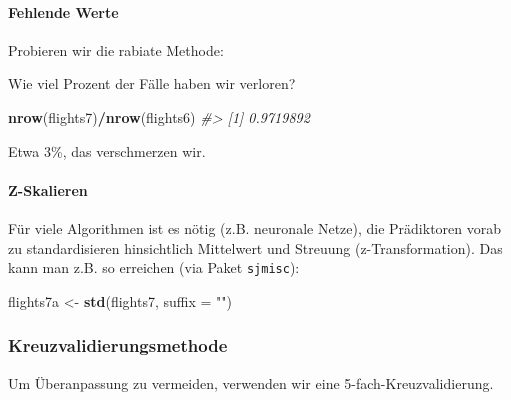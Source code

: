 \documentclass[]{article}
\newenvironment{Shaded}{\begin{snugshade}}{\end{snugshade}}
\newcommand{\CommentTok}[1]{\textcolor[rgb]{0.56,0.35,0.01}{\textit{#1}}}
\newcommand{\DataTypeTok}[1]{\textcolor[rgb]{0.13,0.29,0.53}{#1}}
\newcommand{\KeywordTok}[1]{\textcolor[rgb]{0.13,0.29,0.53}{\textbf{#1}}}
\newcommand{\NormalTok}[1]{#1}
\newcommand{\OperatorTok}[1]{\textcolor[rgb]{0.81,0.36,0.00}{\textbf{#1}}}
\newcommand{\StringTok}[1]{\textcolor[rgb]{0.31,0.60,0.02}{#1}}
\let\oldparagraph\paragraph
\renewcommand{\paragraph}[1]{\oldparagraph{#1}\mbox{}}
\begin{document}
\hypertarget{fehlende-werte}{%
\paragraph{Fehlende Werte}\label{fehlende-werte}}

Probieren wir die rabiate Methode:

\begin{Shaded}
\end{Shaded}

Wie viel Prozent der Fälle haben wir verloren?

\begin{Shaded}
\begin{Highlighting}[]
\KeywordTok{nrow}\NormalTok{(flights7)}\OperatorTok{/}\KeywordTok{nrow}\NormalTok{(flights6)}
\CommentTok{#> [1] 0.9719892}
\end{Highlighting}
\end{Shaded}

Etwa 3\%, das verschmerzen wir.

\hypertarget{z-skalieren}{%
\paragraph{Z-Skalieren}\label{z-skalieren}}

Für viele Algorithmen ist es nötig (z.B. neuronale Netze), die
Prädiktoren vorab zu standardisieren hinsichtlich Mittelwert und
Streuung (z-Transformation). Das kann man z.B. so erreichen (via Paket
\texttt{sjmisc}):

\begin{Shaded}
\begin{Highlighting}[]
\NormalTok{flights7a <-}\StringTok{ }\KeywordTok{std}\NormalTok{(flights7, }\DataTypeTok{suffix =} \StringTok{""}\NormalTok{) }
\end{Highlighting}
\end{Shaded}

\hypertarget{kreuzvalidierungsmethode}{%
\subsubsection{Kreuzvalidierungsmethode}\label{kreuzvalidierungsmethode}}

Um Überanpassung zu vermeiden, verwenden wir eine
5-fach-Kreuzvalidierung.
\end{document}
